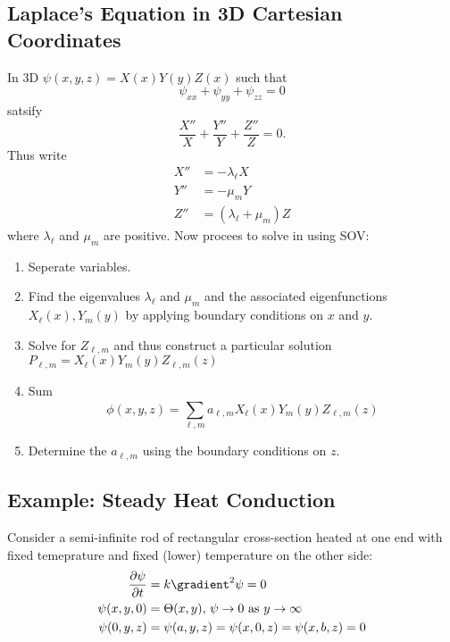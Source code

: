 \documentclass[a4paper]{article}
\newcommand*\grad{\gradient}
\newcommand*\laplace{\grad^2}
\newcommand*\lap{\laplace}
\begin{document}
\subsection{Laplace's Equation in 3D Cartesian Coordinates}

In 3D \(\psi(x, y, z) = X(x) Y(y) Z(x)\) such that
\[
  \psi_{xx} +\psi_{yy} + \psi_{zz} = 0
\]
satsify
\[
  \frac{X''}{X} +\frac{Y''}{Y} +\frac{Z''}{Z} = 0 .
\]
Thus write
\begin{align*}
  X'' &= -\lambda_\ell X \\
  Y'' &= -\mu_m Y \\
  Z'' &= (\lambda_\ell + \mu_m) Z
\end{align*}
where \(\lambda_\ell\) and \(\mu_m\) are positive. Now procees to solve in using SOV:
\begin{enumerate}
\item Seperate variables.
\item Find the eigenvalues \(\lambda_\ell\) and \(\mu_m\) and the associated eigenfunctions \(X_\ell(x), Y_m(y)\) by applying boundary conditions on \(x\) and \(y\).
\item Solve for \(Z_{\ell,m}\) and thus construct a particular solution \(P_{\ell, m} = X_\ell(x) Y_m(y) Z_{\ell, m}(z)\)
\item Sum
  \[
    \phi(x, y, z) = \sum_{\ell, m}^{ } a_{\ell, m} X_\ell(x) Y_m(y) Z_{\ell, m}(z)
  \]
\item Determine the \(a_{\ell, m}\) using the boundary conditions on \(z\).
\end{enumerate}

\subsection{Example: Steady Heat Conduction}

Consider a semi-infinite rod of rectangular cross-section heated at one end with fixed temeprature and fixed (lower) temperature on the other side:
\begin{align*}
  \frac{\partial \psi}{\partial t} &= k \lap \psi = 0 \\
  \psi(x, y, 0) &= \Theta(x, y), \, \psi \to 0 \text{ as } y \to \infty \\
  \psi(0, y, z) &= \psi(a, y, z) = \psi(x, 0, z) = \psi(x, b, z) = 0
\end{align*}
\end{document}
